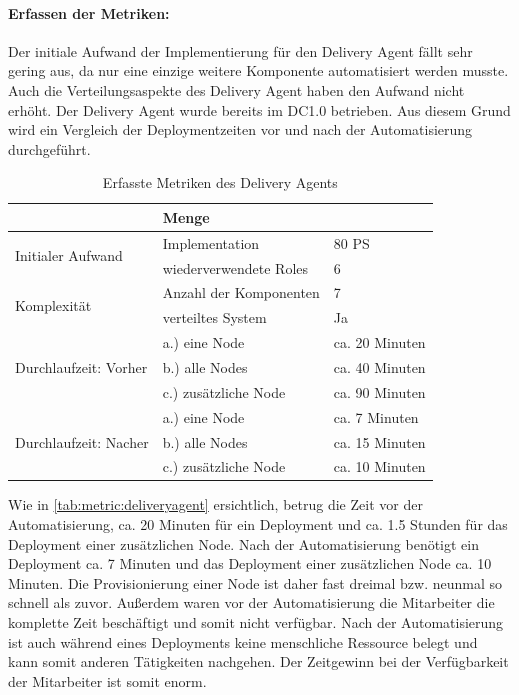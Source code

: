 \paragraph{Erfassen der Metriken:}
Der initiale Aufwand der Implementierung für den Delivery Agent fällt sehr gering aus, da nur eine einzige weitere Komponente automatisiert werden musste. Auch die Verteilungsaspekte des Delivery Agent haben den Aufwand nicht erhöht. Der Delivery Agent wurde bereits im DC1.0 betrieben. Aus diesem Grund wird ein Vergleich der Deploymentzeiten vor und nach der Automatisierung durchgeführt. 
\begin{table}[ht]
\setlength{\tabcolsep}{5pt}
\renewcommand{\arraystretch}{1.5}
\centering
\begin{tabular}{|l|l|l|}
\hline
\rowcolor[HTML]{C0C0C0}
\multicolumn{2}{|c|}{\textbf{Metrik}} & \textbf{Menge}					\\ 
\hline
\multirow{2}{*}{Initialer Aufwand}	& Implementation & 80 PS	\\ 
\cline{2-3}
									& wiederverwendete Roles & 6		\\
\hline 
\multirow{2}{*}{Komplexität}			& Anzahl der Komponenten & 7 		\\
\cline{2-3}
									& verteiltes System		& Ja 		\\
\hline
\multirow{3}{*}{Durchlaufzeit: Vorher} & a.) eine Node		& ca. 20 Minuten	\\ 
\cline{2-3} 
									& b.) alle Nodes		& ca. 40 Minuten	\\ 
\cline{2-3}							
									& c.) zusätzliche Node	& ca. 90 Minuten \\
\hline
\multirow{3}{*}{Durchlaufzeit: Nacher} & a.) eine Node	& ca. 7 Minuten	\\ 
\cline{2-3} 
									& b.) alle Nodes		& ca. 15 Minuten	\\
\cline{2-3}
									& c.) zusätzliche Node	& ca. 10 Minuten\\
\hline
\end{tabular} 
\caption{Erfasste Metriken des Delivery Agents}
\label{tab:metric:deliveryagent}
\end{table}
Wie in \autoref{tab:metric:deliveryagent} ersichtlich, betrug die Zeit vor der Automatisierung, ca. 20 Minuten für ein Deployment und ca. 1.5 Stunden für das Deployment einer zusätzlichen Node. Nach der Automatisierung benötigt ein Deployment ca. 7 Minuten und das Deployment einer zusätzlichen Node ca. 10 Minuten. Die Provisionierung einer Node ist daher fast dreimal bzw. neunmal so schnell als zuvor. Außerdem waren vor der Automatisierung die Mitarbeiter die komplette Zeit beschäftigt und somit nicht verfügbar. Nach der Automatisierung ist auch während eines Deployments keine menschliche Ressource belegt und kann somit anderen Tätigkeiten nachgehen. Der Zeitgewinn bei der Verfügbarkeit der Mitarbeiter ist somit enorm.

